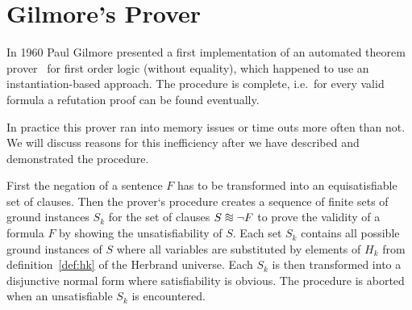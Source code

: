 
\section{Gilmore's Prover}\label{sec:gilmore:prover}

In 1960 Paul Gilmore presented a first { implementation} of an automated
theorem prover~\cite{5392528} for first order logic (without equality),
which happened to use an instantiation-based approach.
The procedure is complete, i.e.~for every valid formula
a refutation proof can be found eventually.

In practice this prover ran into memory issues or time outs more often than not.
We will discuss reasons for this inefficiency after we have described and demonstrated the procedure.

First the negation of a sentence \( F \) has to be transformed into an equisatisfiable set of clauses.
Then the prover`s procedure
creates a sequence of finite sets of ground instances \( S_k \)
for the set of clauses \( S\equisat\lnot F \) to prove the validity of a formula \( F \)
by showing the unsatisfiability of \( S \).
Each set \( S_k \) contains all possible ground instances of \( S \)
where all variables are substituted by elements of \( H_k \)
from definition~\ref{def:hk} of the Herbrand universe.
Each \( S_k \) is then transformed into a disjunctive normal form where satisfiability is obvious.
The procedure is aborted when an unsatisfiable \( S_k \) is encountered.

